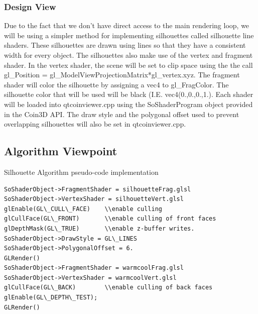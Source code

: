 \documentclass[10pt,journal,compsoc,draftclsnofoot]{IEEEtran}
\begin{document}
\begin{flushleft}
\subsubsection{Design View}
Due to the fact that we don't have direct access to the main rendering loop, we will be using a simpler method for implementing silhouettes called silhouette line shaders.
These silhouettes are drawn using lines so that they have a consistent width for every object.
The silhouettes also make use of the vertex and fragment shader.
In the vertex shader, the scene will be set to clip space using the the call gl\_Position = gl\_ModelViewProjectionMatrix*gl\_vertex.xyz.
The fragment shader will color the silhouette by assigning a vec4 to gl\_FragColor.
The silhouette color that will be used will be black (I.E. vec4(0.,0.,0.,1.).
Each shader will be loaded into qtcoinviewer.cpp using the SoShaderProgram object provided in the Coin3D API.
The draw style and the polygonal offset used to prevent overlapping silhouettes will also be set in qtcoinviewer.cpp.
\newpage

\subsection{Algorithm Viewpoint}
Silhouette Algorithm pseudo-code implementation

\begin{lstlisting}
SoShaderObject->FragmentShader = silhouetteFrag.glsl
SoShaderObject->VertexShader = silhouetteVert.glsl
glEnable(GL\_CULL\_FACE)	\\enable culling
glCullFace(GL\_FRONT)		\\enable culling of front faces
glDepthMask(GL\_TRUE)		\\enable z-buffer writes.
SoShaderObject->DrawStyle = GL\_LINES
SoShaderObject->PolygonalOffset = 6.
GLRender()
SoShaderObject->FragmentShader = warmcoolFrag.glsl
SoShaderObject->VertexShader = warmcoolVert.glsl
glCullFace(GL\_BACK)		\\enable culling of back faces
glEnable(GL\_DEPTH\_TEST);
GLRender()
\end{lstlisting}


\end{flushleft}
\end{document}
